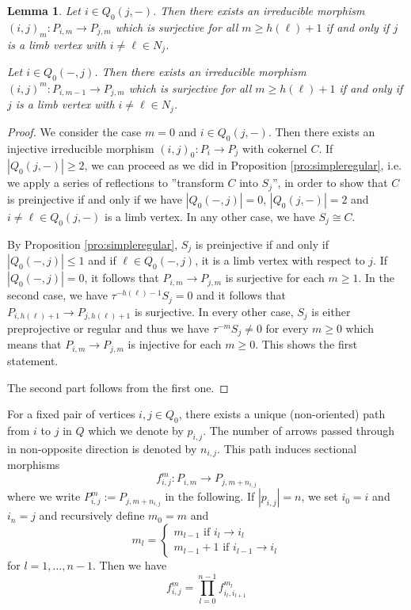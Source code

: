 \documentclass{amsart}
\newcommand{\sayT}[1]{\say[T]{#1}}
\newtheorem{lemma}[theorem]{Lemma}
\numberwithin{equation}{section}
\begin{document}
\begin{lemma}\label{le:irreducible morphisms}
Let $i\in Q_0(j,-)$. Then there exists an irreducible morphism $(i,j)_m:P_{i,m}\to P_{j,m}$ which is surjective for all $m\geq h(\ell)+1$  \sayT{check $\pm 1$} if and only if $j$ is a limb vertex with $i\neq \ell\in N_j$.

Let $i\in Q_0(-,j)$. Then there exists an irreducible morphism $(i,j)^m:P_{i,m-1}\to P_{j,m}$ which is surjective for all $m\geq h(\ell)+1$ if and only if $j$ is a limb vertex with $i\neq \ell\in N_j$. 


\end{lemma}
\begin{proof}

We consider the case $m=0$ and $i\in Q_0(j,-)$. Then there exists an injective irreducible morphism $(i,j)_0:P_{i}\to P_j$ with cokernel $C$. If $|Q_0(j,-)|\geq 2$, we can proceed as we did in Proposition \ref{pro:simpleregular}, i.e. we apply a series of reflections to ''transform $C$ into $S_j$'', in order to show that $C$ is preinjective if and only if we have $|Q_0(-,j)|=0$, $|Q_0(j,-)|=2$ and $i\neq \ell\in Q_0(j,-)$ is a limb vertex. In any other case, we have $S_j\cong C$.

By Proposition \ref{pro:simpleregular}, $S_j$ is preinjective if and only if $|Q_0(-,j)|\leq 1$ and if $\ell\in Q_0(-,j)$, it is a limb vertex with respect to $j$. If $|Q_0(-,j)|=0$, it follows that $P_{i,m}\to P_{j,m}$ is surjective for each $m\geq 1$. In the second case, we have $\tau^{-h(\ell)-1}S_j=0$ and it follows that $P_{i,h(\ell)+1}\to P_{j,h(\ell)+1}$   is surjective. In every other case, $S_j$ is either preprojective or regular and thus we have $\tau^{-m}S_j\neq 0$ for every $m\geq 0$ which means that $P_{i,m}\to P_{j,m}$ is injective for each $m\geq 0$. This shows the first statement.

The second part follows from the first one.



\end{proof}


For a fixed pair of vertices $i,j\in Q_0$, there exists a unique (non-oriented) path from $i$ to $j$ in $Q$ which we denote by $p_{i,j}$. The number of arrows passed through in non-opposite direction is denoted by $n_{i,j}$. This path induces sectional morphisms
$$f_{i,j}^m:P_{i,m}\to P_{j,m+n_{i,j}}$$
where we write $P_{i,j}^m:=P_{j,m+n_{i,j}}$ in the following.
If $|p_{i,j}|=n$, we set $i_0=i$ and $i_n=j$ and recursively define $m_0=m$ and $$m_l=\begin{cases}m_{l-1}\text{ if $i_{l}\to i_l$}\\m_{l-1}+1\text{ if $i_{l-1}\to i_l$}\end{cases}$$
for $l=1,\ldots,n-1$. Then we have $$f_{i,j}^m=\prod_{l=0}^{n-1} f_{i_l,i_{l+1}}^{m_l}$$ 
\end{document}
